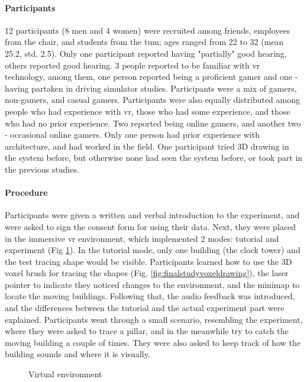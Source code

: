 \paragraph{Participants}
12 participants (8 men and 4 women) were recruited among friends, employees from the chair, and students from the \gls{tum}; ages ranged from 22 to 32 (mean 25.2, std. 2.5). Only one participant reported having "partially" good hearing, others reported good hearing. 3 people reported to be familiar with \gls{vr} technology, among them, one person reported being a proficient gamer and one - having partaken in driving simulator studies. Participants were a mix of gamers, non-gamers, and casual gamers. Participants were also equally distributed among people who had experience with \gls{vr}, those who had some experience, and those who had no prior experience. Two reported being online gamers, and another two - occasional online gamers. Only one person had prior experience with architecture, and had worked in the field. One participant tried 3D drawing in the system before, but otherwise none had seen the system before, or took part in the previous studies.

\paragraph{Procedure}
Participants were given a written and verbal introduction to the experiment,
and were asked to sign the consent form for using their data.
Next, they were placed in the immersive \gls{vr} environment, which implemented 2 modes: tutorial and experiment (Fig \ref{fig:finalstudy_immersive_vr_environment}). In the tutorial mode, only one building (the clock tower) and the test tracing shape would be visible.
Participants learned how to use the 3D voxel brush for tracing the shapes (Fig. \ref{fig:finalstudyvoxeldrawing}), the laser pointer to indicate they noticed changes to the environment, and the minimap to locate the moving buildings. Following that, the audio feedback was introduced, and the differences between the tutorial and the actual experiment part were explained. Participants went through a small scenario, resembling the experiment, where they were asked to trace a pillar, and in the meanwhile try to catch the moving building a couple of times. They were also asked to keep track of how the building sounds and where it is visually.

\begin{figure}
	\centering
	
	\par
	\par
	
	\caption{Virtual environment}
	\label{fig:finalstudy_immersive_vr_environment}
\end{figure}

